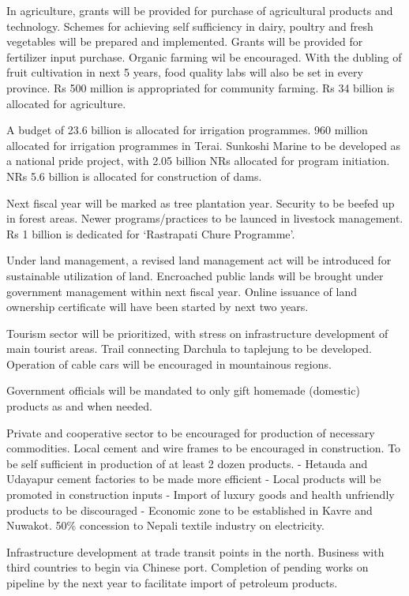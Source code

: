 \documentclass[
  openany]{book}
\begin{document}
In agriculture, grants will be provided for purchase of agricultural products and technology. Schemes for achieving self sufficiency in dairy, poultry and fresh vegetables will be prepared and implemented. Grants will be provided for fertilizer input purchase. Organic farming wil be encouraged. With the dubling of fruit cultivation in next 5 years, food quality labs will also be set in every province. Rs 500 million is appropriated for community farming. Rs 34 billion is allocated for agriculture.

A budget of 23.6 billion is allocated for irrigation programmes. 960 million allocated for irrigation programmes in Terai. Sunkoshi Marine to be developed as a national pride project, with 2.05 billion NRs allocated for program initiation. NRs 5.6 billion is allocated for construction of dams.

Next fiscal year will be marked as tree plantation year. Security to be beefed up in forest areas. Newer programs/practices to be launced in livestock management. Rs 1 billion is dedicated for `Rastrapati Chure Programme'.

Under land management, a revised land management act will be introduced for sustainable utilization of land. Encroached public lands will be brought under government management within next fiscal year. Online issuance of land ownership certificate will have been started by next two years.

Tourism sector will be prioritized, with stress on infrastructure development of main tourist areas. Trail connecting Darchula to taplejung to be developed. Operation of cable cars will be encouraged in mountainous regions.

Government officials will be mandated to only gift homemade (domestic) products as and when needed.

Private and cooperative sector to be encouraged for production of necessary commodities. Local cement and wire frames to be encouraged in construction. To be self sufficient in production of at least 2 dozen products.
- Hetauda and Udayapur cement factories to be made more efficient
- Local products will be promoted in construction inputs
- Import of luxury goods and health unfriendly products to be discouraged
- Economic zone to be established in Kavre and Nuwakot. 50\% concession to Nepali textile industry on electricity.

Infrastructure development at trade transit points in the north. Business with third countries to begin via Chinese port. Completion of pending works on pipeline by the next year to facilitate import of petroleum products.
\end{document}
